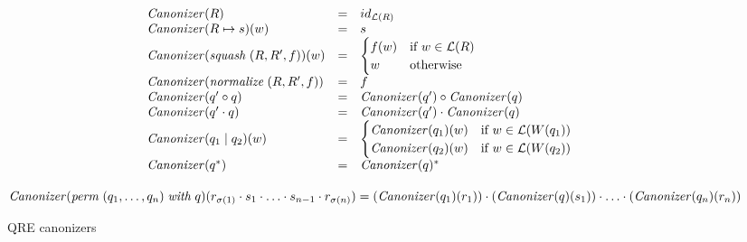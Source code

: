 \documentclass{svproc}
\newcommand{\squash}[3]{\ensuremath{\mathit{squash} \; (#1, #2, #3)}}
\newcommand{\perm}[2]{\ensuremath{\mathit{perm}\; (#1)\; \mathit{with}\; #2}}
\newcommand{\normalize}[3]{\ensuremath{\mathit{normalize} \; (#1, #2, #3)}}
\newcommand{\sep}{\ensuremath{\; | \;}}
\newcommand{\canonizer}{\ensuremath{\mathit{Canonizer}}}
\begin{document}
\begin{figure}[t]
  \begin{center}
\[
    \begin{array}{l@\quad l @\quad l} 
      \canonizer(R) &=& id_{\mathcal{L}(R)} \\
      \canonizer(R \mapsto s)(w) &=& s\\
      \canonizer(\squash{R}{R'}{f})(w) &=& 
\begin{cases}
f(w) & \text{if } w \in \mathcal{L}(R)\\
w & \text{otherwise}
\end{cases}\\
      \canonizer(\normalize{R}{R'}{f}) &=& f\\
      \canonizer(q' \circ q) &=& \canonizer(q') \circ \canonizer(q)\\
      \canonizer(q' \cdot q) &=& \canonizer(q') \cdot \canonizer(q)\\
      \canonizer(q_1 \sep q_2)(w) &=& 
\begin{cases}
\canonizer(q_1)(w) & \text{if } w \in \mathcal{L}(W(q_1))\\
\canonizer(q_2)(w) & \text{if } w \in \mathcal{L}(W(q_2))\\
\end{cases}\\
      \canonizer(q^*) &=& \canonizer(q)^* \\
    \end{array}
    \]
    \end{center}
    $\canonizer(\perm{q_1, \ldots, q_n}{q})(r_{\sigma(1)}
\cdot s_1 \cdot \ldots \cdot s_{n-1} \cdot r_{\sigma(n)}) \newline
= (\canonizer(q_1)(r_1)) \cdot (\canonizer(q)(s_1)) \cdot \ldots \cdot
(\canonizer(q_n)(r_n))$
  \caption{QRE canonizers}
  \label{fig:canonizers}
\end{figure}
\end{document}
